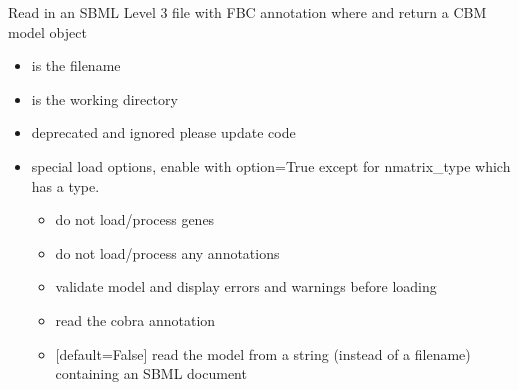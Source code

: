 \documentclass[letterpaper,10pt,english]{sphinxmanual}
\begin{document}
\begin{fulllineitems}
\label{\detokenize{modules_doc:cbmpy.CBRead.readSBML3FBC}}
\pysigstartsignatures
{}
\pysigstopsignatures
\sphinxAtStartPar
Read in an SBML Level 3 file with FBC annotation where and return a CBM model object
\begin{itemize}
\item {} 
\sphinxAtStartPar
{} is the filename

\item {} 
\sphinxAtStartPar
{} is the working directory

\item {} 
\sphinxAtStartPar
{} deprecated and ignored please update code

\item {} 
\sphinxAtStartPar
{} special load options, enable with option=True except for nmatrix\_type which has a type.
\begin{itemize}
\item {} 
\sphinxAtStartPar
{} do not load/process genes

\item {} 
\sphinxAtStartPar
{} do not load/process any annotations

\item {} 
\sphinxAtStartPar
{} validate model and display errors and warnings before loading

\item {} 
\sphinxAtStartPar
{} read the cobra annotation

\item {} 
\sphinxAtStartPar
{} {[}default=False{]} read the model from a string (instead of a filename) containing an SBML document


\end{itemize}
\end{itemize}
\end{fulllineitems}
\end{document}
